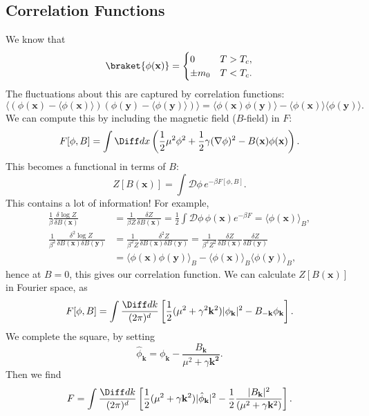 \documentclass[12pt]{article}
\begin{document}

\subsection{Correlation Functions}%
\label{sub:cor_fns}

We know that
\[
	\braket{\phi(\mathbf{x})} =
	\begin{cases}
		0 & T > T_c,\\
		\pm m_0 & T < T_c.
	\end{cases}
\]
The fluctuations about this are captured by correlation functions:
\[
	\langle(\phi(\mathbf{x}) - \langle \phi(\mathbf{x})\rangle)(\phi(\mathbf{y}) - \langle\phi(\mathbf{y})\rangle)\rangle = \langle\phi(\mathbf{x}) \phi(\mathbf{y})\rangle - \langle\phi(\mathbf{x})\rangle \langle \phi(\mathbf{y}) \rangle.
\]
We can compute this by including the magnetic field ($B$-field) in $F$:
\[
	F[\phi, B] = \int \Diff d x \left( \frac{1}{2} \mu^2 \phi^2 + \frac{1}{2} \gamma(\nabla \phi)^2 - B(\mathbf{x}) \phi(\mathbf{x}) \right).
\]
This becomes a functional in terms of $B$:
\[
	Z[B(\mathbf{x})] = \int \mathcal{D} \phi \, e^{-\beta F[\phi, B]}.
\]
This contains a lot of information! For example,
\begin{align*}
	\frac{1}{\beta} \frac{\delta \log Z}{\delta B(\mathbf{x})} &= \frac{1}{\beta Z} \frac{\delta Z}{\delta B(\mathbf{x})} = \frac{1}{2} \int \mathcal{D} \phi \, \phi(\mathbf{x}) e^{-\beta F} = \langle \phi(\mathbf{x})\rangle_B, \\
	\frac{1}{\beta^2} \frac{\delta^2 \log Z}{\delta B(\mathbf{x}) \delta B(\mathbf{y})} &= \frac{1}{\beta^2 Z} \frac{\delta^2 Z}{\delta B(\mathbf{x}) \delta B(\mathbf{y})} = \frac{1}{\beta^2 Z^2} \frac{\delta Z}{\delta B(\mathbf{x})} \frac{\delta Z}{\delta B(\mathbf{y})} \\
											    &= \langle \phi(\mathbf{x}) \phi(\mathbf{y}) \rangle_B - \langle \phi(\mathbf{x}) \rangle_B \langle \phi(\mathbf{y}) \rangle_B,
\end{align*}
hence at $B = 0$, this gives our correlation function. We can calculate $Z[B(\mathbf{x})]$ in Fourier space, as
\[
	F[\phi, B] = \int \frac{\Diff d k}{(2 \pi)^d} \left[ \frac{1}{2} (\mu^2 + \gamma^2 \mathbf{k}^2) |\phi_{\mathbf{k}}|^2 - B_{-\mathbf{k}} \phi_{\mathbf{k}} \right].
\]
We complete the square, by setting
\[
\hat \phi_{\mathbf{k}} = \phi_{\mathbf{k}} - \frac{B_{\mathbf{k}}}{\mu^2 + \gamma \mathbf{k^2}}.
\]
Then we find
\[
	F = \int \frac{\Diff d k}{(2 \pi)^d} \left[ \frac{1}{2} (\mu^2 + \gamma \mathbf{k}^2)|\hat \phi_{\mathbf{k}}|^2 - \frac{1}{2} \frac{|B_{\mathbf{k}}|^2}{(\mu^2 + \gamma \mathbf{k}^2)} \right].
\]
\end{document}
